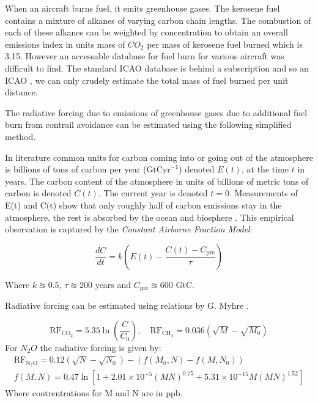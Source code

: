 \documentclass{article}
\begin{document}
When an aircraft burns fuel, it emits greenhouse gases.
The kerosene fuel contains a mixture of alkanes of varying carbon chain lengths.
The combustion of each of these alkanes can be weighted by concentration to obtain an overall
emissions index in units mass of $CO_2$ per mass of kerosene fuel burned which is 3.15.
However an accessable database for fuel burn for various aircraft was difficult to find.
The standard ICAO database is behind a subscription and so an ICAO , we can only crudely estimate the total mass of fuel burned per unit distance.

The radiative forcing due to emissions of greenhouse gases due to additional fuel burn from contrail avoidance can be estimated using the following simplified method.

In literature common units for carbon coming into or going out of the atmosphere is billions of tons of carbon per year ($\text{GtCyr}^{-1}$)
denoted $E(t)$, at the time $t$ in years. The carbon content of the atmosphere in units of billions of metric tons of carbon is denoted $C(t)$.
The current year is denoted $t=0$.
Measurements of E(t) and C(t) show that only roughly half of carbon emissions stay in the atmosphere, the rest is absorbed by the ocean and biosphere \cite{co2_modelling}.
This empirical observation is captured by the \emph{Constant Airborne Fraction Model}:

\begin{equation}
    \frac{dC}{dt} = k \left( E(t) - \frac{C(t)-C_\text{pre}}{\tau}\right)
\end{equation}

Where $k \approxeq 0.5$, $\tau \approxeq 200 $ years and $C_\text{pre} \approxeq 600$ GtC.

Radiative forcing can be estimated using relations by G. Myhre \cite{rf_greenhouse}.

\begin{equation}
    \text{RF}_{\text{CO}_2} = 5.35 \ln \left( \frac{C}{C_0} \right), \quad \text{RF}_{\text{CH}_4} = 0.036 \left( \sqrt{M}-\sqrt{M_0} \right)
\end{equation}
For $N_2O$ the radiative forcing is given by:
\begin{eqnarray}
    \text{RF}_{\text{N}_2\text{O}} = 0.12(\sqrt{N} - \sqrt{N_0}) - (f(M_0,N) - f(M,N_0)) \\
    f(M, N) = 0.47 \ln\left[1 + 2.01 \times 10^{-5} (MN)^{0.75} + 5.31 \times 10^{-15} M (MN)^{1.52}\right]
\end{eqnarray}
Where contrentrations for M and N are in ppb.
\end{document}
